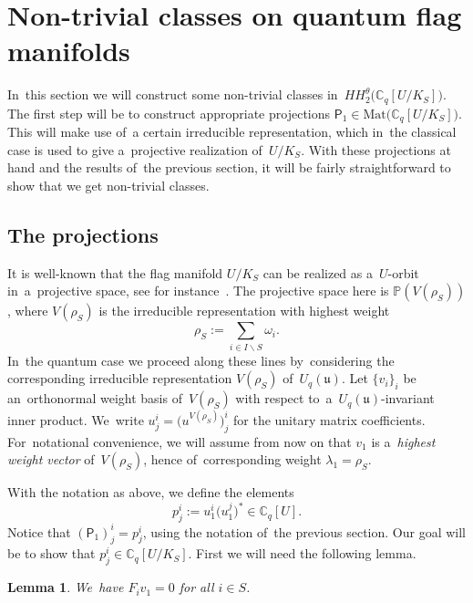 \documentclass[pdftex]{sigma}
\numberwithin{equation}{section}
\newtheorem{Lemma}[Theorem]{Lemma}
\newcommand{\Uqu}{U_q(\mathfrak{u})}
\newcommand{\CqU}{\mathbb{C}_q[U]}
\newcommand{\Cqflag}{\mathbb{C}_q[U / K_S]}
\newcommand{\proj}{\mathsf{P}}
\begin{document}
\section{Non-trivial classes on quantum flag manifolds}\label{sec:quantum-classes}

In~this section we will construct some non-trivial classes in~$HH^\theta_2\big(\Cqflag\big)$.
The first step will be to construct appropriate projections $\proj_1 \in \mathrm{Mat}\big(\Cqflag\big)$.
This will make use of~a certain irreducible representation, which in~the classical case is used to give a~projective realization of~$U / K_S$. With these projections at hand and the results of~the previous section, it will be fairly straightforward to show that we get non-trivial classes.

\subsection{The projections}
\label{sec:proj-quantum}

It is well-known that the flag manifold $U / K_S$ can be realized as a~$U$-orbit in~a~projective space, see for instance~\cite[Section~3.2.8]{cap-book}.
The projective space here is $\mathbb{P}(V(\rho_S))$, where $V(\rho_S)$ is the irreducible representation with highest weight
\[
\rho_S := \sum_{i \in I \backslash S} \omega_i.
\]
In~the quantum case we proceed along these lines by~considering the corresponding irreducible representation $V(\rho_S)$ of~$\Uqu$.
Let $\{v_i\}_i$ be an~orthonormal weight basis of~$V(\rho_S)$ with respect to~a~$\Uqu$-invariant inner product.
We~write $u^i_j = \big(u^{V(\rho_S)}\big)^i_j$ for the unitary matrix coefficients.
For~notational convenience, we will assume from now on that $v_1$ is a~\emph{highest weight vector} of~$V(\rho_S)$, hence of~corresponding weight $\lambda_1 = \rho_S$.

With the notation as above, we define the elements
\begin{equation}
\label{eq:quantum-proj}
p^i_j := u^i_1 \big(u^j_1\big)^* \in \CqU.
\end{equation}
Notice that $(\proj_1)^i_j = p^i_j$, using the notation of~the previous section.
Our goal will be to show that $p^i_j \in \Cqflag$.
First we will need the following lemma.

\begin{Lemma}
\label{lem:action-Fi}
We~have $F_i v_1 = 0$ for all $i \in S$.
\end{Lemma}
\end{document}
